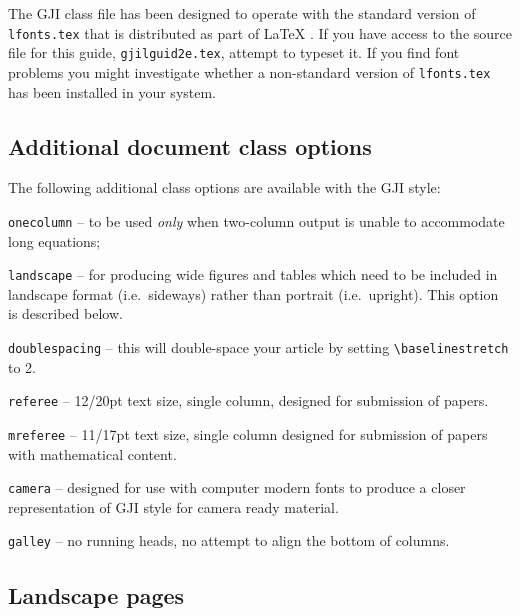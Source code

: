 \documentclass{gji}
\begin{document}
The GJI class file has been designed to operate with the standard
version of \verb"lfonts.tex" that is distributed as part of \LaTeX
. If you have access to the source file for this guide,
\verb"gjilguid2e.tex", attempt to typeset it.  If you find font
problems you might investigate whether a non-standard version of
\verb"lfonts.tex" has been installed in your system.

\subsection{Additional document class options}\label{classoptions}

The following additional class options are available with the GJI style:
\begin{description}
  \item \texttt{onecolumn} -- to be used \textit{only} when two-column output
        is unable to accommodate long equations;
  \item \texttt{landscape} -- for producing wide figures and tables which
        need to be included in landscape format (i.e.\ sideways) rather
        than portrait (i.e.\ upright). This option is described below.
  \item \texttt{doublespacing} -- this will double-space your
        article by setting \verb"\baselinestretch" to 2.
  \item \texttt{referee} -- 12/20pt text size, single column,
        designed for submission of papers.
  \item \texttt{mreferee} -- 11/17pt text size, single column
        designed for submission of papers with mathematical content.
  \item \texttt{camera} -- designed for use with computer modern fonts to
        produce a closer representation of GJI style for camera
        ready material.
  \item \texttt{galley} -- no running heads, no attempt to align
        the bottom of columns.
\end{description}


\subsection{Landscape pages}
\end{document}
